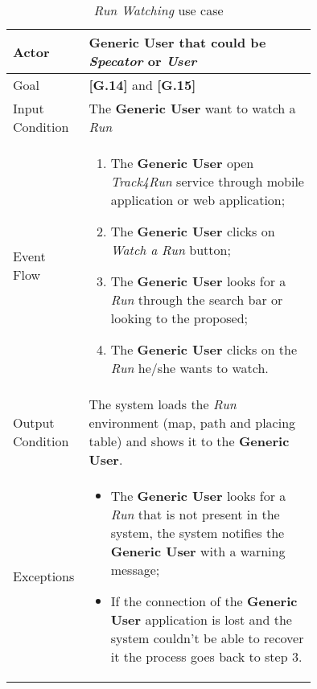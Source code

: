 \begin{center}
\begin{table}
\begin{tabular}{ | l | p{0.75\linewidth} | }
  \hline
    Actor & \textbf{Generic User} that could be \textit{Specator} or \textit{User} \\ \hline
    Goal & \textbf{[G.14]} and \textbf{[G.15]} \\ \hline
    Input Condition & The \textbf{Generic User} want to watch a \textit{Run} \\ \hline
    Event Flow & \begin{minipage}[t]{0.7\textwidth}
      \begin{enumerate}
        \item The \textbf{Generic User} open \textit{Track4Run} service through mobile application or web application;
        \item The \textbf{Generic User} clicks on \textit{Watch a Run} button;
        \item The \textbf{Generic User} looks for a \textit{Run} through the search bar or looking to the proposed;
        \item The \textbf{Generic User} clicks on the \textit{Run} he/she wants to watch.
      \end{enumerate}
    \smallskip
  \end{minipage} \\ \hline
  Output Condition & The system loads the \textit{Run} environment (map, path and placing table) and  shows it to the \textbf{Generic User}. \\ \hline
  Exceptions & \begin{minipage}[t]{0.7\textwidth}
    \begin{itemize}
      \smallskip
      \item The \textbf{Generic User} looks for a \textit{Run} that is not present in the system, the system notifies the \textbf{Generic User} with a warning message;
      \item If the connection of the \textbf{Generic User} application is lost and the system couldn't be able to recover it the process goes back to step 3.
    \end{itemize}
    \smallskip
  \end{minipage}  \\ \hline
\end{tabular}
\caption{\textit{Run Watching} use case}
\label{table:visitRunTable}
\end{table}
\end{center}

